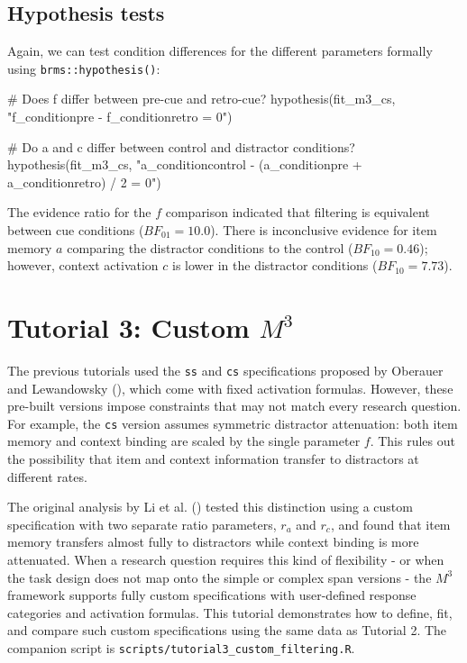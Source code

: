 \documentclass[
  man,
  floatsintext,
  longtable,
  nolmodern,
  notxfonts,
  notimes,
  colorlinks=true,linkcolor=blue,citecolor=blue,urlcolor=blue]{apa7}
\newenvironment{Shaded}{\begin{snugshade}}{\end{snugshade}}
\newcommand{\CommentTok}[1]{\textcolor[rgb]{0.37,0.37,0.37}{#1}}
\newcommand{\FunctionTok}[1]{\textcolor[rgb]{0.28,0.35,0.67}{#1}}
\newcommand{\NormalTok}[1]{\textcolor[rgb]{0.00,0.23,0.31}{#1}}
\newcommand{\StringTok}[1]{\textcolor[rgb]{0.13,0.47,0.30}{#1}}
\begin{document}
\subsection{Hypothesis tests}\label{hypothesis-tests}

Again, we can test condition differences for the different parameters
formally using \texttt{brms::hypothesis()}:

\begin{Shaded}
\begin{Highlighting}[]
\CommentTok{\# Does f differ between pre{-}cue and retro{-}cue?}
\FunctionTok{hypothesis}\NormalTok{(fit\_m3\_cs, }\StringTok{"f\_conditionpre {-} f\_conditionretro = 0"}\NormalTok{)}

\CommentTok{\# Do a and c differ between control and distractor conditions?}
\FunctionTok{hypothesis}\NormalTok{(fit\_m3\_cs,}
  \StringTok{"a\_conditioncontrol {-} (a\_conditionpre + a\_conditionretro) / 2 = 0"}\NormalTok{)}
\end{Highlighting}
\end{Shaded}

The evidence ratio for the \(f\) comparison indicated that filtering is
equivalent between cue conditions (\(BF_{01} = 10.0\)). There is
inconclusive evidence for item memory \(a\) comparing the distractor
conditions to the control (\(BF_{10} = 0.46\)); however, context
activation \(c\) is lower in the distractor conditions
(\(BF_{10} = 7.73\)).

\section{\texorpdfstring{Tutorial 3: Custom
\(M^3\)}{Tutorial 3: Custom M\^{}3}}\label{tutorial-3-custom-m3}

The previous tutorials used the \texttt{ss} and \texttt{cs}
specifications proposed by Oberauer and Lewandowsky
(), which come with fixed
activation formulas. However, these pre-built versions impose
constraints that may not match every research question. For example, the
\texttt{cs} version assumes symmetric distractor attenuation: both item
memory and context binding are scaled by the single parameter \(f\).
This rules out the possibility that item and context information
transfer to distractors at different rates.

The original analysis by Li et al.
() tested this distinction using a
custom specification with two separate ratio parameters, \(r_a\) and
\(r_c\), and found that item memory transfers almost fully to
distractors while context binding is more attenuated. When a research
question requires this kind of flexibility - or when the task design
does not map onto the simple or complex span versions - the \(M^3\)
framework supports fully custom specifications with user-defined
response categories and activation formulas. This tutorial demonstrates
how to define, fit, and compare such custom specifications using the
same data as Tutorial 2. The companion script is
\texttt{scripts/tutorial3\_custom\_filtering.R}.
\end{document}
